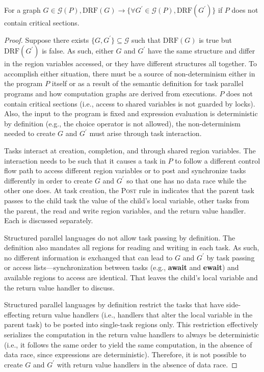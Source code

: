 \begin{lemma} 
\label{lem:drf}
For a graph $G \in \mathcal{G}( P ), \mathrm{DRF}( G ) \rightarrow \{\forall G^\prime \in \mathcal{G}( P ), \mathrm{DRF}( G^\prime ) \}$ if $P$ does not contain critical sections.
\end{lemma}
\begin{proof}
  Suppose there exists $\{G,G^\prime\} \subseteq \mathcal{G}$ such that $\mathrm{DRF}( G )$ is true but $\mathrm{DRF}( G^\prime )$ is false. As such, either $G$ and $G^\prime$ have the same structure and differ in the region variables accessed, or they have different structures all together. To accomplish either situation, there must be a source of non-determinism either in the program $P$ itself or as a result of the semantic definition for task parallel programs and how computation graphs are derived from executions. $P$ does not contain critical sections (i.e., access to shared variables is not guarded by locks). Also, the input to the program is fixed and expression evaluation is deterministic by definition (e.g., the choice operator is not allowed), the non-determinism needed to create $G$ and $G^\prime$ must arise through task interaction. 

  Tasks interact at creation, completion, and through shared region variables. The interaction needs to be such that it causes a task in $P$ to follow a different control flow path to access different region variables or to post and synchronize tasks differently in order to create $G$ and $G^\prime$ so that one has no data race while the other one does. At task creation, the \textsc{Post} rule in  indicates that the parent task passes to the child task the value of the child's local variable, other tasks from the parent, the read and write region variables, and the return value handler. Each is discussed separately.

  Structured parallel languages do not allow task passing by definition. The definition also mandates all regions for reading and writing in each task. As such, no different information is exchanged that can lead to $G$ and $G^\prime$ by task passing or access lists---synchronization between tasks (e.g., \textbf{await} and \textbf{ewait}) and available regions to access are identical. That leaves the child's local variable and the return value handler to discuss.

  Structured parallel languages by definition restrict the tasks that have side-effecting return value handlers (i.e., handlers that alter the local variable in the parent task) to be posted into single-task regions only. This restriction effectively serializes the computation in the return value handlers to always be deterministic (i.e., it follows the same order to yield the same computation, in the absence of data race, since expressions are deterministic). Therefore, it is not possible to create $G$ and $G^\prime$ with return value handlers in the absence of data race.


\end{proof}
